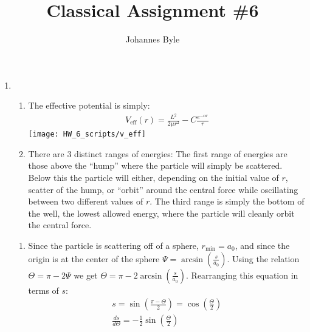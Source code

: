 \documentclass[12pt]{article}
\title{Classical Assignment \#6}
\author{Johannes Byle}
\newcommand{\der}[2]{\frac{d #1}{d #2}}
\begin{document}
  \maketitle
  \begin{enumerate}
    \item
    \begin{enumerate}
      \item The effective potential is simply:
      \begin{gather*}
        V_{\text{eff}}(r)=\frac{L^2}{2\mu r^2}-C\frac{e^{-\alpha r}}{r}
      \end{gather*}
      \texttt{[image: HW\_6\_scripts/v\_eff]}
      \item
      There are 3 distinct ranges of energies:
      The first range of energies are those above the \enquote{hump} where the particle will simply be scattered.
      Below this the particle will either, depending on the initial value of $r$, scatter of the hump, or \enquote{orbit} around the central force while oscillating between two different values of $r$.
      The third range is simply the bottom of the well, the lowest allowed energy, where the particle will cleanly orbit the central force.
    \end{enumerate}
    \begin{enumerate}
      \item Since the particle is scattering off of a sphere, $r_{\text{min}}=a_0$, and since the origin is at the center of the sphere $\Psi=\arcsin\left( \frac{s}{a_0} \right)$.
      Using the relation $\Theta=\pi-2\Psi$ we get $\Theta=\pi-2\arcsin\left( \frac{s}{a_0} \right)$.
      Rearranging this equation in terms of $s$:
      \begin{gather*}
        s=\sin\left(\frac{\pi-\Theta}{2}\right)=\cos\left( \frac{\Theta}{2} \right)\\
        \der{s}{\Theta}=-\frac{1}{2}\sin\left( \frac{\Theta}{2} \right)
      \end{gather*}

    \end{enumerate}
  \end{enumerate}
\end{document}
